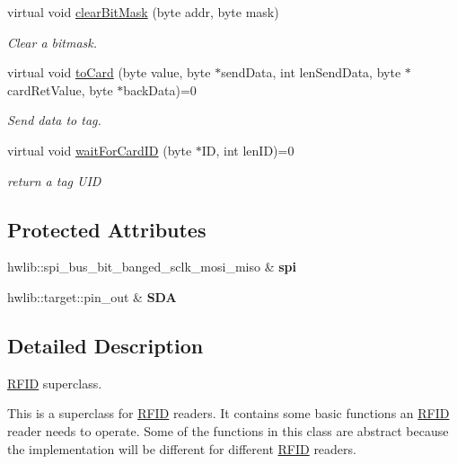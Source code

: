 \begin{DoxyCompactItemize}
virtual void \hyperlink{class_r_f_i_d_afa2560b026553dac1f6aa20d17f47438}{clear\+Bit\+Mask} (byte addr, byte mask)
\begin{DoxyCompactList}\small\item\em Clear a bitmask. \end{DoxyCompactList}\item 
virtual void \hyperlink{class_r_f_i_d_ad44955169cde018c9673ae5073fcac24}{to\+Card} (byte value, byte $\ast$send\+Data, int len\+Send\+Data, byte $\ast$card\+Ret\+Value, byte $\ast$back\+Data)=0
\begin{DoxyCompactList}\small\item\em Send data to tag. \end{DoxyCompactList}\item 
virtual void \hyperlink{class_r_f_i_d_a7e02863bc0f1f117b05d72f9063497f7}{wait\+For\+Card\+ID} (byte $\ast$ID, int len\+ID)=0
\begin{DoxyCompactList}\small\item\em return a tag U\+ID \end{DoxyCompactList}\end{DoxyCompactItemize}
\subsection*{Protected Attributes}
\begin{DoxyCompactItemize}
\item 
hwlib\+::spi\+\_\+bus\+\_\+bit\+\_\+banged\+\_\+sclk\+\_\+mosi\+\_\+miso \& {\bfseries spi}\hypertarget{class_r_f_i_d_ad2de95fbca075609eb41fa8d27d96077}{}\label{class_r_f_i_d_ad2de95fbca075609eb41fa8d27d96077}

\item 
hwlib\+::target\+::pin\+\_\+out \& {\bfseries S\+DA}\hypertarget{class_r_f_i_d_a4367d5ca78409b651a56920886e8fac2}{}\label{class_r_f_i_d_a4367d5ca78409b651a56920886e8fac2}

\end{DoxyCompactItemize}


\subsection{Detailed Description}
\hyperlink{class_r_f_i_d}{R\+F\+ID} superclass. 

This is a superclass for \hyperlink{class_r_f_i_d}{R\+F\+ID} readers. It contains some basic functions an \hyperlink{class_r_f_i_d}{R\+F\+ID} reader needs to operate. Some of the functions in this class are abstract because the implementation will be different for different \hyperlink{class_r_f_i_d}{R\+F\+ID} readers. 

